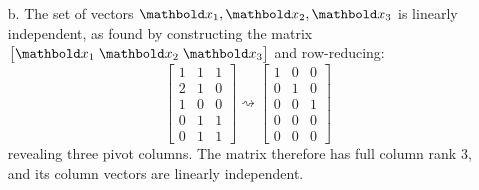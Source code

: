 \documentclass[11pt]{article}
\begin{document}
\begin{enumerate}
\begin{enumerate}
              \item[b.] The set of vectors $\vect{x}_1, \vect{x}_2, \vect{x}_3$ is linearly independent, as found
                    by constructing the matrix $\begin{bmatrix}
                            \vect{x}_1 \; \vect{x}_2 \; \vect{x}_3
                        \end{bmatrix}$ and row-reducing:
                    \[
                        \begin{bmatrix}
                            1 & 1 & 1 \\
                            2 & 1 & 0 \\
                            1 & 0 & 0 \\
                            0 & 1 & 1 \\
                            0 & 1 & 1
                        \end{bmatrix}
                        \rightsquigarrow
                        \begin{bmatrix}
                            1 & 0 & 0 \\
                            0 & 1 & 0 \\
                            0 & 0 & 1 \\
                            0 & 0 & 0 \\
                            0 & 0 & 0
                        \end{bmatrix}
                    \]
                    revealing three pivot columns. The matrix therefore has full column rank $3$, and its column
                    vectors are linearly independent.

          \end{enumerate}


\end{enumerate}
\end{document}
